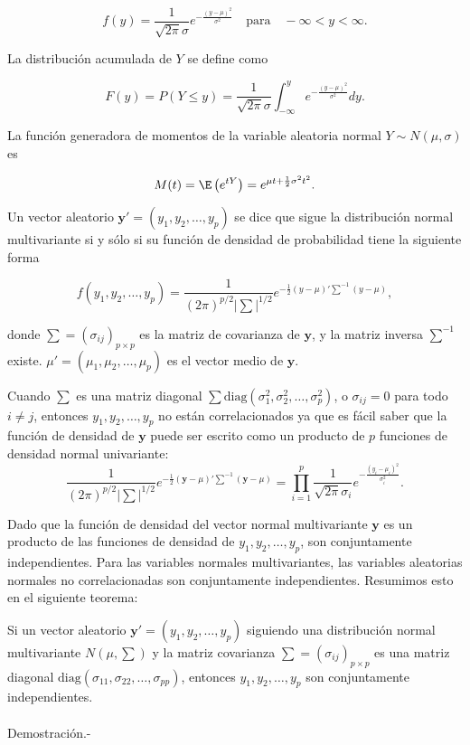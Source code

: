 \begin{tcolorbox}
    $$f(y)=\frac{1}{\sqrt{2\pi}\sigma}e^{-\frac{(y-\mu)^2}{\sigma^2}} \quad \mbox{para}\quad -\infty<y<\infty.$$
\end{tcolorbox}

La distribución acumulada de $Y$ se define como

\begin{tcolorbox}
    $$F(y)=P(Y\leq y) = \dfrac{1}{\sqrt{2\pi}\sigma}\int_{-\infty}^y e^{-\frac{(y-\mu)^2}{\sigma^2}}dy.$$
\end{tcolorbox}

La función generadora de momentos de la variable aleatoria normal $Y\sim N(\mu,\sigma)$ es

\begin{tcolorbox}
    $$M(t)=\E\left(e^{tY}\right)=e^{\mu t+\frac{1}{2}\sigma^2t^2}.$$
\end{tcolorbox}

Un vector aleatorio $\textbf{y}'=(y_1,y_2,\ldots,y_p)$ se dice que sigue la distribución normal multivariante si y sólo si su función de densidad de probabilidad tiene la siguiente forma

$$f(y_1,y_2,\ldots,y_p)=\dfrac{1}{(2\pi)^{p/2}|\sum|^{1/2}}e^{-\frac{1}{2}(y-\mu)'\sum^{-1}(y-\mu)},$$

donde $\sum=(\sigma_{ij})_{p\times p}$ es la matriz de covarianza de $\textbf{y}$, y la matriz inversa $\sum^{-1}$ existe.  $\mu'=(\mu_1,\mu_2,\ldots,\mu_p)$ es el vector medio de $\textbf{y}$.

Cuando $\sum$ es una matriz diagonal $\sum \mbox{diag}\left(\sigma_1^2,\sigma_2^2,\ldots,\sigma_p^2\right)$, o $\sigma_{ij}=0$ para todo $i\neq j$, entonces $y_1,y_2,\ldots,y_p$ no están correlacionados ya que es fácil saber que la función de densidad de $\textbf{y}$ puede ser escrito como un producto de $p$ funciones de densidad normal univariante:
$$\dfrac{1}{(2\pi)^{p/2}|\sum|^{1/2}}e^{-\frac{1}{2}(\textbf{y}-\mu)'\sum^{-1}(\textbf{y}-\mu)} = \prod_{i=1}^p \dfrac{1}{\sqrt{2\pi}\sigma_i}e^{-\frac{(y_i-\mu_i)^2}{\sigma_i^2}}.$$

Dado que la función de densidad del vector normal multivariante $\textbf{y}$ es un producto de las funciones de densidad de $y_1 , y_2 , \ldots , y_p$, son conjuntamente independientes. Para las variables normales multivariantes, las variables aleatorias normales no correlacionadas son conjuntamente independientes. Resumimos esto en el siguiente teorema:

\begin{teo}
    Si un vector aleatorio $\textbf{y}'=(y_1,y_2,\ldots,y_p)$ siguiendo una distribución normal multivariante $N(\mu,\sum)$ y la matriz covarianza $\sum = \left(\sigma_{ij}\right)_{p\times p}$ es una matriz diagonal $\mbox{diag}\left(\sigma_{11},\sigma_{22},\ldots,\sigma_{pp}\right)$, entonces $y_1,y_2,\ldots,y_p$ son conjuntamente independientes.\\\\
	Demostración.-\; 
\end{teo}

